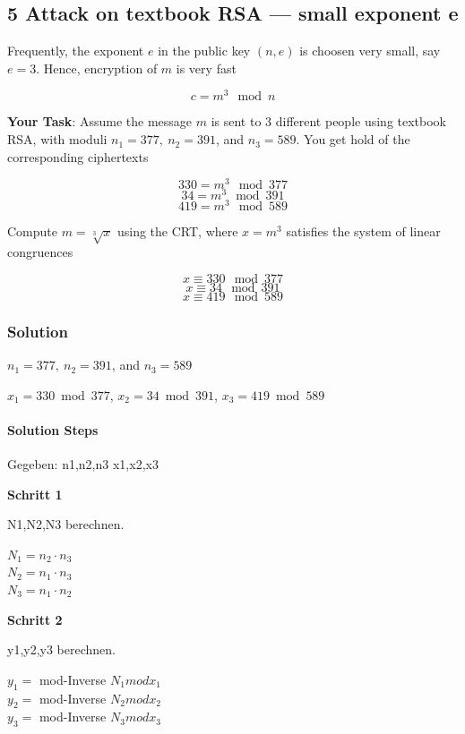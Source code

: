 \documentclass[11pt]{article}
\begin{document}
    \hypertarget{attack-on-textbook-rsa-small-exponent-e}{%
\subsection{5 Attack on textbook RSA --- small exponent
e}\label{attack-on-textbook-rsa-small-exponent-e}}

Frequently, the exponent \(e\) in the public key \((n,e)\) is choosen
very small, say \(e = 3\). Hence, encryption of \(m\) is very fast

\[ c = m^3 \mod n\]

\textbf{Your Task}: Assume the message \(m\) is sent to 3 different
people using textbook RSA, with moduli \(n_1 = 377,\ n_2 = 391\), and
\(n_3 = 589\). You get hold of the corresponding ciphertexts

\[330 = m^3 \mod 377\] \[34 = m^3 \mod 391\] \[419 = m^3 \mod 589\]

Compute \(m =\sqrt[3]{x}\) using the CRT, where \(x = m^3\) satisfies
the system of linear congruences

\[ x \equiv 330 \mod 377 \] \[ x \equiv 34  \mod 391 \]
\[ x \equiv 419 \mod 589 \]

\hypertarget{solution}{%
\subsubsection{Solution}\label{solution}}

\(n_1 = 377,\ n_2 = 391\), and \(n_3 = 589\)

\(x_1 = 330 \bmod 377\), \(x_2 = 34 \bmod 391\), \(x_3 = 419 \bmod 589\)

\hypertarget{solution-steps}{%
\paragraph{Solution Steps}\label{solution-steps}}

Gegeben: n1,n2,n3 \textbar{} x1,x2,x3

\textbf{Schritt 1}

N1,N2,N3 berechnen.

\(N_1 = n_2 \cdot n_3\)\\
\(N_2 = n_1 \cdot n_3\)\\
\(N_3 = n_1 \cdot n_2\)

\textbf{Schritt 2}

y1,y2,y3 berechnen.

\(y_1 =\) mod-Inverse \(N_1 mod x_1\)\\
\(y_2 =\) mod-Inverse \(N_2 mod x_2\)\\
\(y_3 =\) mod-Inverse \(N_3 mod x_3\)
\end{document}
